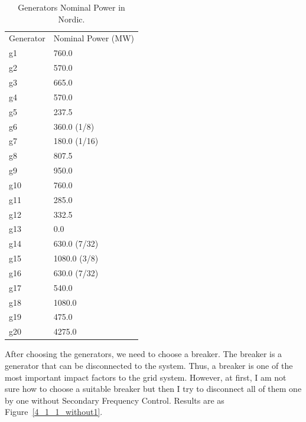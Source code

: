 \begin{table}[htbp]
\centering
\begin{tabular}{ll}
Generator & Nominal Power (MW) \\
g1        & 760.0              \\
g2        & 570.0              \\
g3        & 665.0              \\
g4        & 570.0              \\
g5        & 237.5              \\
g6        & 360.0 (1/8)        \\
g7        & 180.0 (1/16)       \\
g8        & 807.5              \\
g9        & 950.0              \\
g10       & 760.0              \\
g11       & 285.0              \\
g12       & 332.5              \\
g13       & 0.0                \\
g14       & 630.0 (7/32)       \\
g15       & 1080.0 (3/8)       \\
g16       & 630.0 (7/32)       \\
g17       & 540.0              \\
g18       & 1080.0             \\
g19       & 475.0              \\
g20       & 4275.0             

\end{tabular}
\caption{Generators Nominal Power in Nordic.}
\label{nominalPower}
\end{table}

After choosing the generators, we need to choose a breaker. The breaker is a generator that can be disconnected to the system. Thus, a breaker is one of the most important impact factors to the grid system. However, at first, I am not sure how to choose a suitable breaker but then I try to disconnect all of them one by one without Secondary Frequency Control. Results are as Figure~\ref{4_1_1_without1}. 

